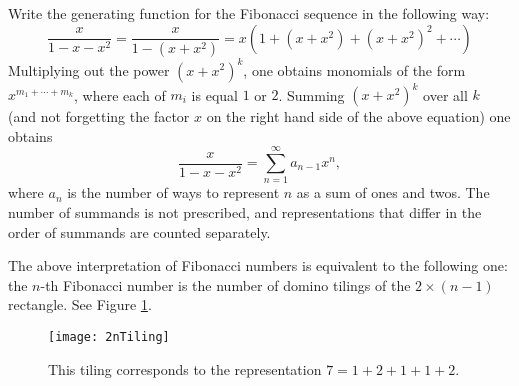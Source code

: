 

\setcounter{section}{3}
\setcounter{subsection}{3}
\setcounter{dfn}{2}

Write the generating function for the Fibonacci sequence in the following way:
\[
\frac{x}{1-x-x^2} = \frac{x}{1-(x+x^2)} = x( 1 + (x+x^2) + (x+x^2)^2 + \cdots)
\]
Multiplying out the power $(x+x^2)^k$, one obtains monomials of the form $x^{m_1+\cdots+m_k}$,
where each of $m_i$ is equal $1$ or $2$.
Summing $(x+x^2)^k$ over all $k$ (and not forgetting the factor $x$ on the right hand side of the above equation) one obtains
\[
\frac{x}{1-x-x^2} = \sum_{n=1}^\infty a_{n-1} x^n,
\]
where $a_n$ is the number of ways to represent $n$ as a sum of ones and twos.
The number of summands is not prescribed, and representations that differ in the order of summands are counted separately.

The above interpretation of Fibonacci numbers is equivalent to the following one:
the $n$-th Fibonacci number is the number of domino tilings of the $2 \times (n-1)$ rectangle.
See Figure \ref{fig:FibDomino}.

\begin{figure}[ht]
\begin{center}
\texttt{[image: 2nTiling]}
\end{center}
\caption{This tiling corresponds to the representation $7 = 1 + 2 + 1 + 1 + 2$.}
\label{fig:FibDomino}
\end{figure}






